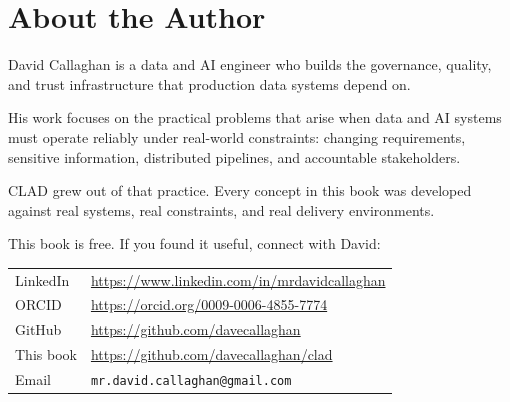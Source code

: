 \chapter*{About the Author}

David Callaghan is a data and AI engineer who builds the governance,
quality, and trust infrastructure that production data systems depend on.

His work focuses on the practical problems that arise when data and AI
systems must operate reliably under real-world constraints: changing
requirements, sensitive information, distributed pipelines, and
accountable stakeholders.

CLAD grew out of that practice.  Every concept in this book was developed
against real systems, real constraints, and real delivery environments.

This book is free.  If you found it useful, connect with David:

\bigskip

\begin{tabular}{@{}ll@{}}
  LinkedIn & \url{https://www.linkedin.com/in/mrdavidcallaghan} \\[4pt]
  ORCID    & \url{https://orcid.org/0009-0006-4855-7774} \\[4pt]
  GitHub   & \url{https://github.com/davecallaghan} \\[4pt]
  This book & \url{https://github.com/davecallaghan/clad} \\[4pt]
  Email    & \texttt{mr.david.callaghan@gmail.com}
\end{tabular}
